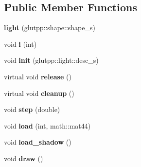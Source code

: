 \subsection*{\-Public \-Member \-Functions}
\begin{DoxyCompactItemize}
\item 
\hypertarget{classglutpp_1_1light_1_1light_a0ca55171134122bde88842bf7ec2fcce}{{\bfseries light} (glutpp\-::shape\-::shape\-\_\-s)}\label{classglutpp_1_1light_1_1light_a0ca55171134122bde88842bf7ec2fcce}

\item 
\hypertarget{classglutpp_1_1light_1_1light_afb6aab641a407977f43393f1145e9ae9}{void {\bfseries i} (int)}\label{classglutpp_1_1light_1_1light_afb6aab641a407977f43393f1145e9ae9}

\item 
\hypertarget{classglutpp_1_1light_1_1light_ac7325e859b66652b5807d0793af509f3}{void {\bfseries init} (glutpp\-::light\-::desc\-\_\-s)}\label{classglutpp_1_1light_1_1light_ac7325e859b66652b5807d0793af509f3}

\item 
\hypertarget{classglutpp_1_1light_1_1light_a84dc2f6887e3423c6083c5c7117e5705}{virtual void {\bfseries release} ()}\label{classglutpp_1_1light_1_1light_a84dc2f6887e3423c6083c5c7117e5705}

\item 
\hypertarget{classglutpp_1_1light_1_1light_a2b84a85ec45ca3c1ce026b66fb0ae310}{virtual void {\bfseries cleanup} ()}\label{classglutpp_1_1light_1_1light_a2b84a85ec45ca3c1ce026b66fb0ae310}

\item 
\hypertarget{classglutpp_1_1light_1_1light_ad27fbd7b4fe66e9137ca3b465042c33f}{void {\bfseries step} (double)}\label{classglutpp_1_1light_1_1light_ad27fbd7b4fe66e9137ca3b465042c33f}

\item 
\hypertarget{classglutpp_1_1light_1_1light_a6146d2771b4b3f2df5dd92c04fa9c9f8}{void {\bfseries load} (int, math\-::mat44)}\label{classglutpp_1_1light_1_1light_a6146d2771b4b3f2df5dd92c04fa9c9f8}

\item 
\hypertarget{classglutpp_1_1light_1_1light_aa37d836e3b1ea0fbd44023482069e0b5}{void {\bfseries load\-\_\-shadow} ()}\label{classglutpp_1_1light_1_1light_aa37d836e3b1ea0fbd44023482069e0b5}

\item 
\hypertarget{classglutpp_1_1light_1_1light_acc8af2c86de3c4e0966ad2e7cdb654ee}{void {\bfseries draw} ()}\label{classglutpp_1_1light_1_1light_acc8af2c86de3c4e0966ad2e7cdb654ee}


\end{DoxyCompactItemize}
